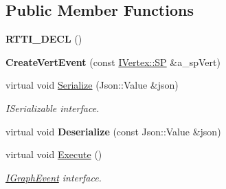 \subsection*{Public Member Functions}
\begin{DoxyCompactItemize}
\item 
\mbox{\label{struct_graph_connector_1_1_create_vert_event_a299ee4be78d6f00220734127fe9491d9}} 
{\bfseries R\+T\+T\+I\+\_\+\+D\+E\+CL} ()
\item 
\mbox{\label{struct_graph_connector_1_1_create_vert_event_a3c84efd555873ae330ed4adc95bb925d}} 
{\bfseries Create\+Vert\+Event} (const \hyperlink{class_i_graph_1_1_i_vertex_af72b9df91f110bc7824c608c10cc819c}{I\+Vertex\+::\+SP} \&a\+\_\+sp\+Vert)
\item 
\mbox{\label{struct_graph_connector_1_1_create_vert_event_a681f1ef0c45f90a64696a190fe8826f8}} 
virtual void \hyperlink{struct_graph_connector_1_1_create_vert_event_a681f1ef0c45f90a64696a190fe8826f8}{Serialize} (Json\+::\+Value \&json)
\begin{DoxyCompactList}\small\item\em I\+Serializable interface. \end{DoxyCompactList}\item 
\mbox{\label{struct_graph_connector_1_1_create_vert_event_a129fa594e912d2c4b9c918843577a19a}} 
virtual void {\bfseries Deserialize} (const Json\+::\+Value \&json)
\item 
\mbox{\label{struct_graph_connector_1_1_create_vert_event_a065f2f224e45404265730cbe7914c91b}} 
virtual void \hyperlink{struct_graph_connector_1_1_create_vert_event_a065f2f224e45404265730cbe7914c91b}{Execute} ()
\begin{DoxyCompactList}\small\item\em \hyperlink{struct_graph_connector_1_1_i_graph_event}{I\+Graph\+Event} interface. \end{DoxyCompactList}\end{DoxyCompactItemize}
